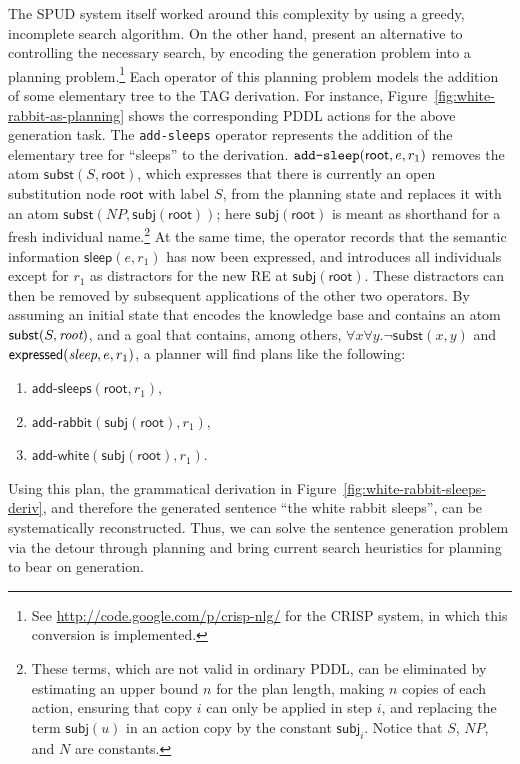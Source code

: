 \documentclass[letterpaper]{article}
\begin{document}
The SPUD system itself worked around this complexity by using a
greedy, incomplete search algorithm. On the other hand,
\citet{KolSto07} present an alternative to controlling the necessary
search, by encoding the generation problem into a planning
problem.\footnote{See \url{http://code.google.com/p/crisp-nlg/} for
  the CRISP system, in which this conversion is implemented.} Each
operator of this planning problem models the addition of some
elementary tree to the TAG derivation. For instance,
Figure~\ref{fig:white-rabbit-as-planning} shows the corresponding PDDL
actions for the above generation task. The \texttt{add-sleeps}
operator represents the addition of the elementary tree for ``sleeps''
to the derivation. $\verb?add-sleep?(\mathsf{root},e,r_1)$ removes the
atom $\mathsf{subst}(S,\mathsf{root})$, which expresses that there is
currently an open substitution node $\mathsf{root}$ with label $S$,
from the planning state and replaces it with an atom
$\mathsf{subst}(NP,\mathsf{subj}(\mathsf{root}))$; here
$\mathsf{subj}(\mathsf{root})$ is meant as shorthand for a fresh
individual name.\footnote{These terms, which are not valid in ordinary
  PDDL, can be eliminated by estimating an upper bound $n$ for the
  plan length, making $n$ copies of each action, ensuring that copy
  $i$ can only be applied in step $i$, and replacing the term
  $\mathsf{subj}(u)$ in an action copy by the constant
  $\mathsf{subj}_i$. Notice that $S$, $NP$, and $N$ are constants.}
At the same time, the operator records that the semantic information
$\mathsf{sleep}(e,r_1)$ has now been expressed, and introduces all
individuals except for $r_1$ as distractors for the new RE at
$\mathsf{subj}(\mathsf{root})$. These distractors can then be removed
by subsequent applications of the other two operators. By assuming an
initial state that encodes the knowledge base and contains an atom
$\mathsf{subst}(S,\emph{root})$, and a goal that contains, among
others, $\forall x \forall y. \neg \mathsf{subst}(x,y)$ and
$\mathsf{expressed}(\emph{sleep},e,r_1)$, a planner will find plans
like the following:
%
\begin{enumerate}
\item $\mathsf{add}\textsf{-}\mathsf{sleeps}(\mathsf{root}, r_1)$,
\item $\mathsf{add}\textsf{-}\mathsf{rabbit}(\mathsf{subj}(\mathsf{root}),r_1)$,
\item $\mathsf{add}\textsf{-}\mathsf{white}(\mathsf{subj}(\mathsf{root}),r_1)$.
\end{enumerate}
%
Using this plan, the grammatical derivation in
Figure~\ref{fig:white-rabbit-sleeps-deriv}, and therefore the
generated sentence ``the white rabbit sleeps'', can be systematically
reconstructed. Thus, we can solve the sentence generation problem via
the detour through planning and bring current search heuristics for
planning to bear on generation.
\end{document}

